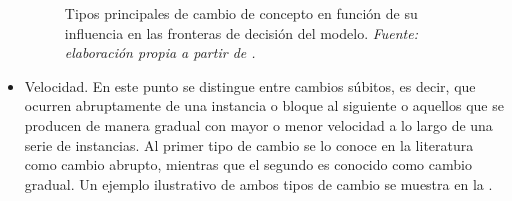 \documentclass[c5paper,10pt,twoside]{book}	   	%
\begin{document}
\begin{itemize}
\begin{figure}[!hbtp]
	\centering
	\caption[Tipos principales de cambio de concepto]{Tipos principales de cambio de concepto en función de su influencia en las fronteras de decisión del modelo. \textit{Fuente: elaboración propia a partir de \cite{Rkgwh17}.}}
	\label{fig:CDTypes}
\end{figure}


	\item Velocidad. En este punto se distingue entre cambios súbitos, es decir, que ocurren abruptamente de una instancia o bloque al siguiente o aquellos que se producen de manera gradual con mayor o menor velocidad a lo largo de una serie de instancias. Al primer tipo de cambio se lo conoce en la literatura como cambio abrupto, mientras que el segundo es conocido como cambio gradual. Un ejemplo ilustrativo de ambos tipos de cambio se muestra en la .
	

\end{itemize}
\end{document}
